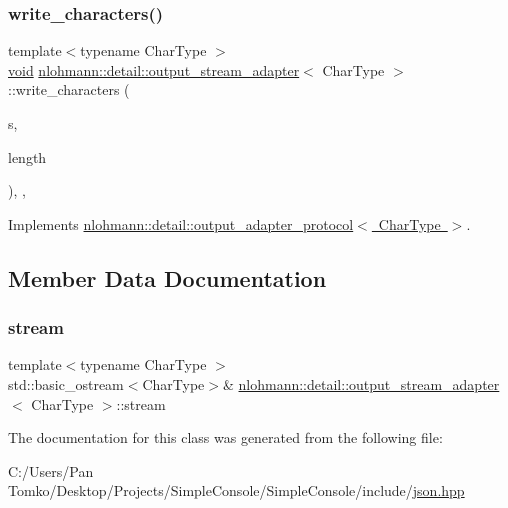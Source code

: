 \subsubsection{\texorpdfstring{write\_characters()}{write\_characters()}}
{\footnotesize\ttfamily template$<$typename Char\+Type $>$ \\
\mbox{\hyperlink{namespacenlohmann_1_1detail_a59fca69799f6b9e366710cb9043aa77d}{void}} \mbox{\hyperlink{classnlohmann_1_1detail_1_1output__stream__adapter}{nlohmann\+::detail\+::output\+\_\+stream\+\_\+adapter}}$<$ Char\+Type $>$\+::write\+\_\+characters (\begin{DoxyParamCaption}\item[{const Char\+Type $\ast$}]{s,  }\item[{std\+::size\+\_\+t}]{length }\end{DoxyParamCaption})\hspace{0.3cm}{\ttfamily [inline]}, {\ttfamily [override]}, {\ttfamily [virtual]}}



Implements \mbox{\hyperlink{structnlohmann_1_1detail_1_1output__adapter__protocol_a2f410a164e0eda17cf6561114b0eee4a}{nlohmann\+::detail\+::output\+\_\+adapter\+\_\+protocol$<$ Char\+Type $>$}}.



\subsection{Member Data Documentation}
\mbox{\label{classnlohmann_1_1detail_1_1output__stream__adapter_aacc26af02e1e5a988bc5dbfb723b5562}} 
\subsubsection{\texorpdfstring{stream}{stream}}
{\footnotesize\ttfamily template$<$typename Char\+Type $>$ \\
std\+::basic\+\_\+ostream$<$Char\+Type$>$\& \mbox{\hyperlink{classnlohmann_1_1detail_1_1output__stream__adapter}{nlohmann\+::detail\+::output\+\_\+stream\+\_\+adapter}}$<$ Char\+Type $>$\+::stream\hspace{0.3cm}{\ttfamily [private]}}



The documentation for this class was generated from the following file\+:\begin{DoxyCompactItemize}
\item 
C\+:/\+Users/\+Pan Tomko/\+Desktop/\+Projects/\+Simple\+Console/\+Simple\+Console/include/\mbox{\hyperlink{json_8hpp}{json.\+hpp}}\end{DoxyCompactItemize}
